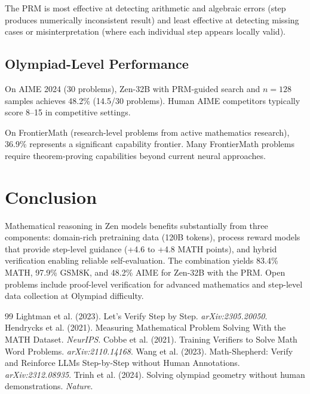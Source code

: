 \documentclass[11pt,a4paper]{article}
\begin{document}
The PRM is most effective at detecting arithmetic and algebraic errors (step produces
numerically inconsistent result) and least effective at detecting missing cases or
misinterpretation (where each individual step appears locally valid).

\subsection{Olympiad-Level Performance}
\label{sec:olympiad}

On AIME 2024 (30 problems), Zen-32B with PRM-guided search and $n=128$ samples
achieves 48.2\% (14.5/30 problems). Human AIME competitors typically score 8--15
in competitive settings.

On FrontierMath (research-level problems from active mathematics research), 36.9\%
represents a significant capability frontier. Many FrontierMath problems require
theorem-proving capabilities beyond current neural approaches.

\section{Conclusion}

Mathematical reasoning in Zen models benefits substantially from three components:
domain-rich pretraining data (120B tokens), process reward models that provide
step-level guidance (+4.6 to +4.8 MATH points), and hybrid verification enabling
reliable self-evaluation. The combination yields 83.4\% MATH, 97.9\% GSM8K, and
48.2\% AIME for Zen-32B with the PRM. Open problems include proof-level verification for advanced mathematics
and step-level data collection at Olympiad difficulty.


\begin{thebibliography}{99}
 Lightman et al. (2023). Let's Verify Step by Step. \textit{arXiv:2305.20050}.
 Hendrycks et al. (2021). Measuring Mathematical Problem Solving With the MATH Dataset. \textit{NeurIPS}.
 Cobbe et al. (2021). Training Verifiers to Solve Math Word Problems. \textit{arXiv:2110.14168}.
 Wang et al. (2023). Math-Shepherd: Verify and Reinforce LLMs Step-by-Step without Human Annotations. \textit{arXiv:2312.08935}.
 Trinh et al. (2024). Solving olympiad geometry without human demonstrations. \textit{Nature}.
\end{thebibliography}
\end{document}
